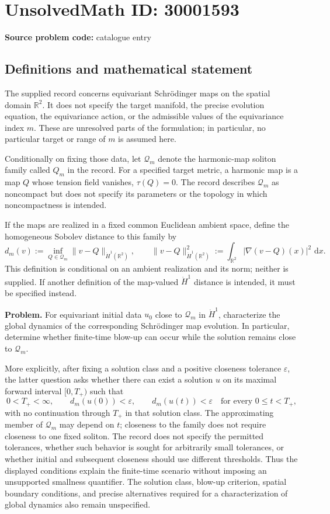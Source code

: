\documentclass[11pt]{article}
\newcommand{\R}{\mathbb{R}}
\newcommand{\dd}{\,\mathrm{d}}
\begin{document}
\section*{UnsolvedMath ID: 30001593}
\textbf{Source problem code:} catalogue entry
\subsection{Definitions and mathematical statement}
The supplied record concerns equivariant Schr\"odinger maps on the spatial domain $\R^2$. It does not specify the target manifold, the precise evolution equation, the equivariance action, or the admissible values of the equivariance index $m$. These are unresolved parts of the formulation; in particular, no particular target or range of $m$ is assumed here.

Conditionally on fixing those data, let $\mathcal Q_m$ denote the harmonic-map soliton family called $Q_m$ in the record. For a specified target metric, a harmonic map is a map $Q$ whose tension field vanishes, $\tau(Q)=0$. The record describes $\mathcal Q_m$ as noncompact but does not specify its parameters or the topology in which noncompactness is intended.

If the maps are realized in a fixed common Euclidean ambient space, define the homogeneous Sobolev distance to this family by
\[
 d_m(v):=\inf_{Q\in\mathcal Q_m}\|v-Q\|_{\dot H^1(\R^2)},
 \qquad
 \|v-Q\|_{\dot H^1(\R^2)}^2
 :=\int_{\R^2}|\nabla(v-Q)(x)|^2\,\dd x.
\]
This definition is conditional on an ambient realization and its norm; neither is supplied. If another definition of the map-valued $\dot H^1$ distance is intended, it must be specified instead.

\textbf{Problem.} For equivariant initial data $u_0$ close to $\mathcal Q_m$ in $\dot H^1$, characterize the global dynamics of the corresponding Schr\"odinger map evolution. In particular, determine whether finite-time blow-up can occur while the solution remains close to $\mathcal Q_m$.

More explicitly, after fixing a solution class and a positive closeness tolerance $\varepsilon$, the latter question asks whether there can exist a solution $u$ on its maximal forward interval $[0,T_+)$ such that
\[
 0<T_+<\infty,
 \qquad
 d_m(u(0))<\varepsilon,
 \qquad
 d_m(u(t))<\varepsilon\quad\text{for every }0\leq t<T_+,
\]
with no continuation through $T_+$ in that solution class. The approximating member of $\mathcal Q_m$ may depend on $t$; closeness to the family does not require closeness to one fixed soliton. The record does not specify the permitted tolerances, whether such behavior is sought for arbitrarily small tolerances, or whether initial and subsequent closeness should use different thresholds. Thus the displayed conditions explain the finite-time scenario without imposing an unsupported smallness quantifier. The solution class, blow-up criterion, spatial boundary conditions, and precise alternatives required for a characterization of global dynamics also remain unspecified.
\end{document}
